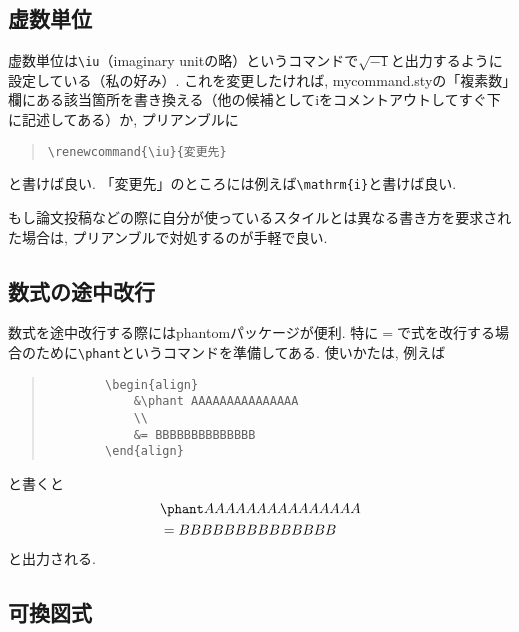 \documentclass[11pt,a4paper,oneside,lualatex]{ltjsarticle} %
\numberwithin{equation}{section} %
\begin{document}
\subsection{虚数単位} \label{subsec:imaginary_unit}


虚数単位は\verb|\iu|（imaginary unitの略）というコマンドで$ \sqrt{-1} $と出力するように設定している（私の好み）. 
これを変更したければ, mycommand.styの「複素数」欄にある該当箇所を書き換える（他の候補として$ \mathrm{i} $をコメントアウトしてすぐ下に記述してある）か, プリアンブルに
\begin{quote}
	\verb|\renewcommand{\iu}{変更先}|
\end{quote}
と書けば良い. 
「変更先」のところには例えば\verb|\mathrm{i}|と書けば良い. 

もし論文投稿などの際に自分が使っているスタイルとは異なる書き方を要求された場合は, プリアンブルで対処するのが手軽で良い. 



\subsection{数式の途中改行} \label{subsec:eq_phantom}


数式を途中改行する際にはphantomパッケージが便利. 
特に$ = $で式を改行する場合のために\verb|\phant|というコマンドを準備してある. 
使いかたは, 例えば
\begin{quote}
	\begin{verbatim}
		\begin{align}
		    &\phant AAAAAAAAAAAAAAA
		    \\
		    &= BBBBBBBBBBBBBB
		\end{align}
	\end{verbatim}
\end{quote}
と書くと
\begin{align}
	&\phant AAAAAAAAAAAAAAA
	\\
	&= BBBBBBBBBBBBBB
\end{align}
と出力される. 


\subsection{可換図式} \label{subsec:comm_diag}
\end{document}
